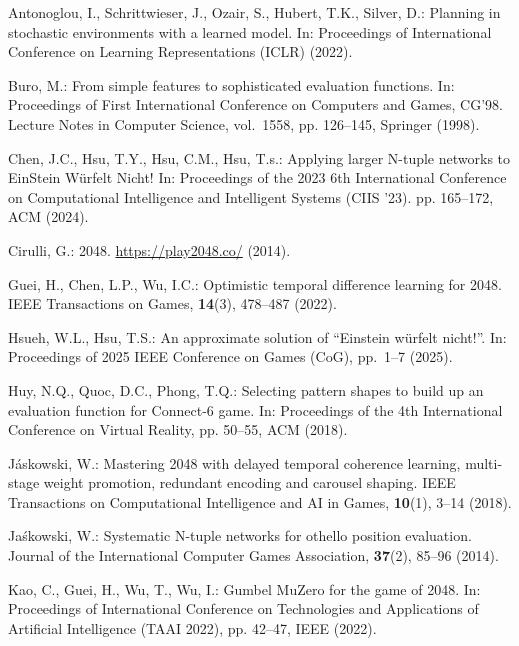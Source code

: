\begin{thebibliography}{10}

Antonoglou, I., Schrittwieser, J., Ozair, S., Hubert, T.K., Silver, D.:
  Planning in stochastic environments with a learned model. In: Proceedings of International
  Conference on Learning Representations (ICLR) (2022).

Buro, M.: From simple features to sophisticated evaluation functions. In:
  Proceedings of First International Conference on Computers and Games, CG'98.
  Lecture Notes in Computer Science, vol.~1558, pp. 126--145, Springer (1998).

Chen, J.C., Hsu, T.Y., Hsu, C.M., Hsu, T.s.: Applying larger {N}-tuple networks
  to {EinStein} {W\"{u}rfelt} {Nicht!} In: Proceedings of the 2023 6th
  International Conference on Computational Intelligence and Intelligent
  Systems (CIIS '23). pp. 165--172, ACM (2024).

Cirulli, G.: 2048. \url{https://play2048.co/} (2014).

Guei, H., Chen, L.P., Wu, I.C.: Optimistic temporal difference learning for
  2048. IEEE Transactions on Games, \textbf{14}(3), 478--487 (2022).

Hsueh, W.L., Hsu, T.S.: An approximate solution of ``Einstein w\"urfelt
  nicht!''. In: Proceedings of 2025 IEEE Conference on Games (CoG), pp.~1--7 (2025).

Huy, N.Q., Quoc, D.C., Phong, T.Q.: Selecting pattern shapes to build up an
  evaluation function for {Connect-6} game. In: Proceedings of the 4th
  International Conference on Virtual Reality, pp. 50--55, ACM (2018).

J\'{a}skowski, W.: Mastering 2048 with delayed temporal coherence learning,
  multi-stage weight promotion, redundant encoding and carousel shaping. IEEE
  Transactions on Computational Intelligence and AI in Games, \textbf{10}(1), 3--14 (2018).

Ja{\'s}kowski, W.: Systematic {N}-tuple networks for othello position
  evaluation. Journal of the International Computer Games Association,
  \textbf{37}(2),  85--96 (2014).

Kao, C., Guei, H., Wu, T., Wu, I.: Gumbel MuZero for the game of 2048. In:
  Proceedings of International Conference on Technologies and Applications of Artificial
  Intelligence ({TAAI} 2022), pp. 42--47, {IEEE} (2022).


\end{thebibliography}

